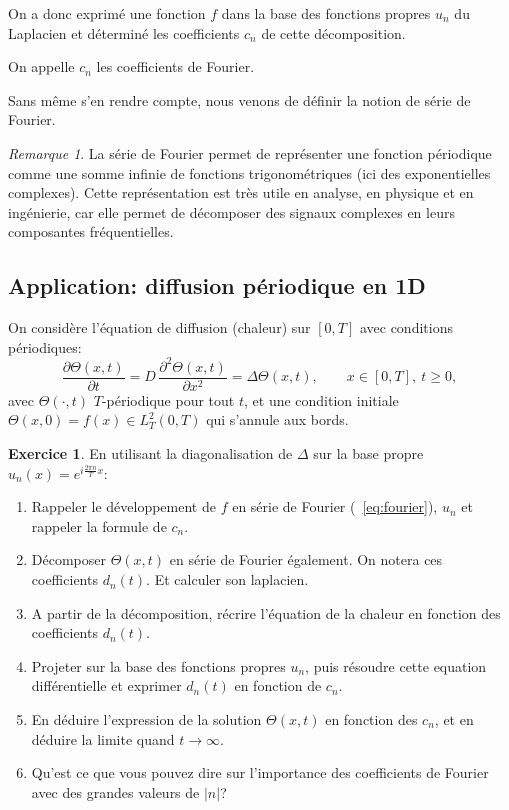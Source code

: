 \documentclass[11pt,a4paper]{article}
\numberwithin{equation}{section}
\theoremstyle{plain}
\theoremstyle{definition}
\newtheorem{exercise}[theorem]{Exercice}
\theoremstyle{remark}
\newtheorem*{remark}{Remarque}
\newcommand{\Lap}{\Delta}
\begin{document}
On a donc exprimé une fonction $f$ dans la base des fonctions propres $u_n$ du Laplacien et déterminé les coefficients $c_n$ de cette décomposition.

On appelle $c_n$ les coefficients de Fourier.

Sans même s'en rendre compte, nous venons de définir la notion de série de Fourier.
\begin{remark}
    La série de Fourier permet de représenter une fonction périodique comme une somme infinie de fonctions trigonométriques (ici des exponentielles complexes).
    Cette représentation est très utile en analyse, en physique et en ingénierie, car elle permet de décomposer des signaux complexes en leurs composantes fréquentielles.
\end{remark}


\subsection{Application: diffusion périodique en 1D}

On considère l'équation de diffusion (chaleur) sur $[0,T]$ avec conditions périodiques:
\[
    \frac{\partial \Theta(x,t)}{\partial t} = D \, \frac{\partial^2 \Theta(x,t)}{\partial x^2} = \Lap \Theta(x,t), \qquad x \in [0,T],\ t\ge 0,
\]
avec $\Theta(\cdot,t)$ $T$-périodique pour tout $t$, et une condition initiale $\Theta(x,0)=f(x)\in L^2_T(0,T)$ qui s'annule aux bords.

\begin{exercise}
    En utilisant la diagonalisation de $\Lap$ sur la base propre $u_n(x)=e^{i\frac{2\pi n}{T}x}$:
    \begin{enumerate}[label=\alph*)]
        \item Rappeler le développement de $f$ en série de Fourier (~\ref{eq:fourier}), $u_n$ et rappeler la formule de $c_n$.
        \item Décomposer $\Theta(x,t)$ en série de Fourier également. On notera ces coefficients $d_n(t)$. Et calculer son laplacien.
        \item A partir de la décomposition, récrire l'équation de la chaleur en fonction des coefficients $d_n(t)$.  
        \item Projeter sur la base des fonctions propres $u_n$, puis résoudre cette equation différentielle et exprimer $d_n(t)$ en fonction de $c_n$.
        \item En déduire l'expression de la solution $\Theta(x,t)$ en fonction des $c_n$, et en déduire la limite quand $t\to\infty$.
        \item Qu'est ce que vous pouvez dire sur l'importance des coefficients de Fourier avec des grandes valeurs de $|n|$?
    \end{enumerate}
\end{exercise}
\end{document}
